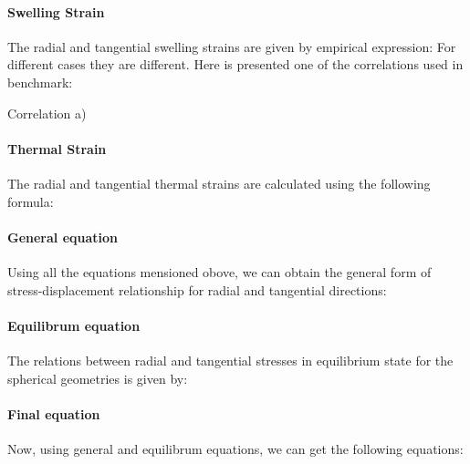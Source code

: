 \documentclass[review]{elsarticle}
\begin{document}
\paragraph{Swelling Strain} The radial and tangential swelling strains are given by  empirical expression: 
For different cases they are different. Here is presented one of the correlations used in benchmark:

Correlation a)
\StrainSwelling


\paragraph{Thermal Strain} The radial and tangential thermal strains are calculated using the following formula:
\StrainThermal 

\paragraph{General equation} Using all the equations mensioned obove, we can obtain the general form of stress-displacement relationship for radial and tangential directions:

\GeneralStrDisRadial
\GeneralStrDisTangential


\linenumbers

\paragraph{Equilibrum equation} The relations between radial and tangential stresses in equilibrium state for the spherical geometries is given by:
\EquilibrumStress 

\paragraph{Final equation} 
Now, using general and equilibrum equations, we can get the following equations:
\end{document}
